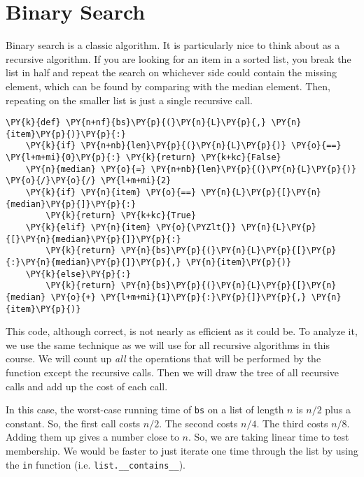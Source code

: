 \chapter{Binary Search}


Binary search is a classic algorithm.
It is particularly nice to think about as a recursive algorithm.
If you are looking for an item in a sorted list, you break the list in half and repeat the search on whichever side could contain the missing element, which can be found by comparing with the median element.
Then, repeating on the smaller list is just a single recursive call.

\begin{Verbatim}[commandchars=\\\{\}]
\PY{k}{def} \PY{n+nf}{bs}\PY{p}{(}\PY{n}{L}\PY{p}{,} \PY{n}{item}\PY{p}{)}\PY{p}{:}
    \PY{k}{if} \PY{n+nb}{len}\PY{p}{(}\PY{n}{L}\PY{p}{)} \PY{o}{==} \PY{l+m+mi}{0}\PY{p}{:} \PY{k}{return} \PY{k+kc}{False}
    \PY{n}{median} \PY{o}{=} \PY{n+nb}{len}\PY{p}{(}\PY{n}{L}\PY{p}{)} \PY{o}{/}\PY{o}{/} \PY{l+m+mi}{2}
    \PY{k}{if} \PY{n}{item} \PY{o}{==} \PY{n}{L}\PY{p}{[}\PY{n}{median}\PY{p}{]}\PY{p}{:}
        \PY{k}{return} \PY{k+kc}{True}
    \PY{k}{elif} \PY{n}{item} \PY{o}{\PYZlt{}} \PY{n}{L}\PY{p}{[}\PY{n}{median}\PY{p}{]}\PY{p}{:}
        \PY{k}{return} \PY{n}{bs}\PY{p}{(}\PY{n}{L}\PY{p}{[}\PY{p}{:}\PY{n}{median}\PY{p}{]}\PY{p}{,} \PY{n}{item}\PY{p}{)}
    \PY{k}{else}\PY{p}{:}
        \PY{k}{return} \PY{n}{bs}\PY{p}{(}\PY{n}{L}\PY{p}{[}\PY{n}{median} \PY{o}{+} \PY{l+m+mi}{1}\PY{p}{:}\PY{p}{]}\PY{p}{,} \PY{n}{item}\PY{p}{)}
\end{Verbatim}



This code, although correct, is not nearly as efficient as it could be.
To analyze it, we use the same technique as we will use for all recursive algorithms in this course.
We will count up \emph{all} the operations that will be performed by the function except the recursive calls.
Then we will draw the tree of all recursive calls and add up the cost of each call.


In this case, the worst-case running time of \texttt{bs} on a list of length $n$ is $n/2$ plus a constant.
So, the first call costs $n/2$.
The second costs $n/4$.
The third costs $n/8$.
Adding them up gives a number close to $n$.
So, we are taking linear time to test membership.
We would be faster to just iterate one time through the list by using the \texttt{in} function (i.e. \texttt{list.\_\_contains\_\_}).



